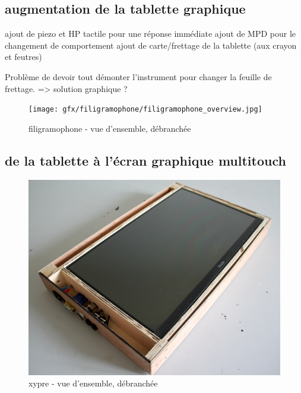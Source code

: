 \subsection{augmentation de la tablette graphique}
ajout de piezo et HP tactile pour une réponse immédiate
ajout de MPD pour le changement de comportement
ajout de carte/frettage de la tablette (aux crayon et feutres)

Problème de devoir tout démonter l'instrument pour changer la feuille de frettage. => solution graphique ?

\begin{figure}[!htbp]
	\texttt{[image: gfx/filigramophone/filigramophone\_overview.jpg]}
	\caption{filigramophone - vue d'ensemble, débranchée}
	\label{fig:interface:filigramophone}
\end{figure}

\subsection{de la tablette à l'écran graphique multitouch}
\begin{figure}[!htbp]
	\includegraphics[width=\textwidth]{gfx/xypre/xypre_overview_unplugged.jpg}
	\caption{xypre - vue d'ensemble, débranchée}
	\label{fig:interface:xypre}
\end{figure}

